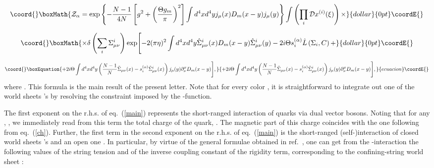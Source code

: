 \documentclass[a4paper,12pt]{article}
\begin{document}
$$\coord{}\boxMath{
{\cal Z}_\alpha=
\exp\left\{-\frac{N-1}{4N}\left[g^2+\left(\frac{\Theta g_m}{\pi}\right)^2\right]
\int d^4x d^4y j_\mu(x)D_m(x-y)j_\mu(y)\right\}
\int\left(\prod\limits_{i}^{}{\cal D}x^{(i)}(\xi)\right)
\times}{dollar}{0pt}\coordE{}$$

$$\coord{}\boxMath{
\times\delta\left(\sum\limits_{i}^{}\Sigma_{\mu\nu}^i\right)
\exp\Biggl[
-2(\pi\eta)^2\int d^4x d^4y\hat\Sigma_{\mu\nu}^i(x)
D_m(x-y)\hat\Sigma_{\mu\nu}^i(y)-2i\Theta s_i^{(\alpha)}\hat L\left(\Sigma_i,C\right)+
}{dollar}{0pt}\coordE{}$$


\begin{equation}\coord{}\boxEquation{
\label{main}
+2i\Theta\int d^4xd^4y\left(\frac{N-1}{N}\tilde\Sigma_{\mu\nu}(x)-s_i^{(\alpha)}\tilde\Sigma_{\mu\nu}^i(x)\right)j_\mu(y)
\partial_\nu^xD_m(x-y)\Biggr],
}{
+2i\Theta\int d^4xd^4y\left(\frac{N-1}{N}\tilde\Sigma_{\mu\nu}(x)-s_i^{(\alpha)}\tilde\Sigma_{\mu\nu}^i(x)\right)j_\mu(y)
\partial_\nu^xD_m(x-y)\Biggr],
}{ecuacion}\coordE{}\end{equation}
where \coordHE{}.
This formula is the main result of the present letter.
Note that
for every color \myHighlight{$\alpha$}\coordHE{}, it is straightforward to
integrate out one of
the world sheets \coordHE{}'s by resolving the constraint
imposed by the \myHighlight{$\delta$}\coordHE{}-function.



The first exponent
on the r.h.s. of eq.~(\ref{main}) represents the short-ranged interaction
of quarks via dual vector bosons. Noting that for any \myHighlight{$\alpha$}\coordHE{},
\coordHE{}, we immediately read from this term the total charge of the
quark, \coordHE{}. The magnetic part of this charge coincides
with the one following from eq.~(\ref{ch}).
Further, the first term in the
second exponent on the r.h.s. of eq.~(\ref{main}) is the
short-ranged (self-)interaction of
closed world sheets \coordHE{}'s and an open one \myHighlight{$\Sigma$}\coordHE{}.
In particular, by virtue of the general formulae obtained in ref.~\cite{mpla}, one can get from
the \myHighlight{$\Sigma\times\Sigma$}\coordHE{}-interaction
the following values of the string tension and of the
inverse coupling constant of the rigidity term, corresponding to the confining-string world sheet \myHighlight{$\Sigma$}\coordHE{}:
\end{document}
